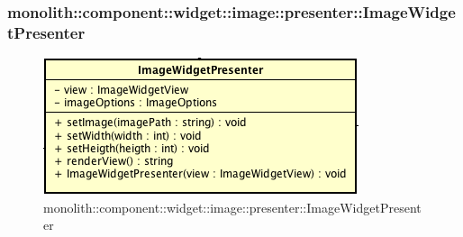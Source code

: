 \subsubsection{monolith::component::widget::image::presenter::ImageWidgetPresenter}

\label{monolith::component::widget::image::presenter::ImageWidgetPresenter}
\begin{figure}[H]
	\centering
	\includegraphics[scale=0.5]{Sezioni/SottosezioniST/img/ImageWidgetPresenter.png}
	\caption{monolith::component::widget::image::presenter::ImageWidgetPresenter}
\end{figure}


